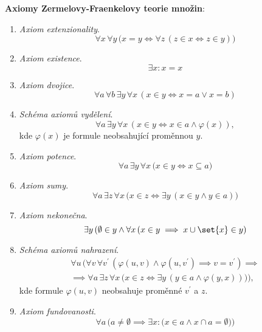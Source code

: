\noindent\textbf{Axiomy Zermelovy-Fraenkelovy teorie množin}:
\begin{enumerate}[label=({ZF}\arabic*)]
    \item\label{item:axiom_extenzionality} \emph{Axiom extenzionality}.
    \begin{equation*}
        \forall x\,\forall y\,\big(x=y \iff \forall z\,(z\in x \iff z\in y)\big)
    \end{equation*}
    \item\label{item:axiom_existence} \emph{Axiom existence}.
    \begin{equation*}
        \exists x: x=x
    \end{equation*}
    \item\label{item:axiom_dvojice} \emph{Axiom dvojice}.
    \begin{equation*}
        \forall a\,\forall b\,\exists y\,\forall x\,(x \in y \iff x=a \lor x=b)
    \end{equation*}
    \item\label{item:schema_axiomu_vydeleni} \emph{Schéma axiomů vydělení}.
    \begin{equation*}
        \forall a\,\exists y\,\forall x\,(x\in y \iff x\in a \land \varphi(x)),
    \end{equation*}
    kde $\varphi(x)$ je formule neobsahující proměnnou $y$.
    \item\label{item:axiom_potence} \emph{Axiom potence}.
    \begin{equation*}
        \forall a\,\exists y\,\forall x\,\big(x\in y \iff x\subseteq a\big)
    \end{equation*}
    \item\label{item:axiom_sumy} \emph{Axiom sumy}.
    \begin{equation*}
        \forall a\,\exists z\,\forall x\,\big(x\in z\iff \exists y\,(x\in y \land y\in a)\big)
    \end{equation*}
    \item\label{item:axiom_nekonecna} \emph{Axiom nekonečna}.
    \begin{equation*}
        \exists y\, (\emptyset\in y \land \forall x\,(x\in y\implies x\cup\set{x}\in y)
    \end{equation*}
    \item\label{item:schema_axiomu_nahrazeni} \emph{Schéma axiomů nahrazení}.
    \begin{align*}
        \forall u\,\Big(\forall v\,\forall v^\prime\,(\varphi(u,v) \land \varphi(u,v^\prime) \implies v=v^\prime)\implies\\ \implies \forall a\,\exists z\,\forall x\,\big(x\in z \iff \exists y\,(y\in a \land \varphi(y,x))\big)\Big),
    \end{align*}
    kde formule $\varphi(u,v)$ neobsahuje proměnné $v^\prime$ a $z$.
    \item\label{item:axiom_fundovanosti} \emph{Axiom fundovanosti}.
    \begin{equation*}
        \forall a\,\Big(a\neq\emptyset \implies \exists x:\big(x\in a \land x\cap a=\emptyset\big)\Big)
    \end{equation*}
\end{enumerate}
